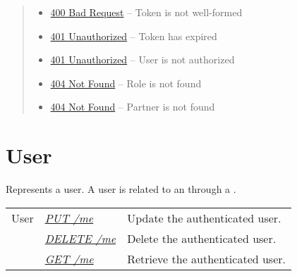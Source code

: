\documentclass[letterpaper,10pt,english]{sphinxmanual}
\begin{document}
\begin{fulllineitems}
\begin{quote}
\begin{description}
\begin{itemize}
\item {} 
\href{http://www.w3.org/Protocols/rfc2616/rfc2616-sec10.html\#sec10.4.1}{400 Bad Request} -- Token is not well-formed

\item {} 
\href{http://www.w3.org/Protocols/rfc2616/rfc2616-sec10.html\#sec10.4.2}{401 Unauthorized} -- Token has expired

\item {} 
\href{http://www.w3.org/Protocols/rfc2616/rfc2616-sec10.html\#sec10.4.2}{401 Unauthorized} -- User is not authorized

\item {} 
\href{http://www.w3.org/Protocols/rfc2616/rfc2616-sec10.html\#sec10.4.5}{404 Not Found} -- Role is not found

\item {} 
\href{http://www.w3.org/Protocols/rfc2616/rfc2616-sec10.html\#sec10.4.5}{404 Not Found} -- Partner is not found

\end{itemize}

\end{description}\end{quote}

\end{fulllineitems}



\section{User}
\label{\detokenize{resources/user:user}}\label{\detokenize{resources/user::doc}}\label{\detokenize{resources/user:id1}}
Represents a user. A user is related to an {\hyperref[\detokenize{resources/organization:organization}]{}} through a {\hyperref[\detokenize{resources/partner:partner}]{}}.

\noindent\begin{tabulary}{\linewidth}{|L|L|L|}
\hline
{}\relax &\relax &\relax \\
\hline
User
&
{\hyperref[\detokenize{resources/user:put--me}]{\emph{PUT /me}}}
&
Update the authenticated user.
\\
\hline&
{\hyperref[\detokenize{resources/user:delete--me}]{\emph{DELETE /me}}}
&
Delete the authenticated user.
\\
\hline&
{\hyperref[\detokenize{resources/user:get--me}]{\emph{GET /me}}}
&
Retrieve the authenticated user.
\\
\hline\end{tabulary}
\end{document}
